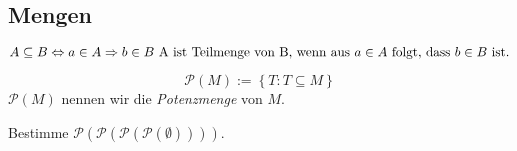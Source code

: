 \documentclass[10pt]{scrbook}
\begin{document}
\subsection{Mengen}
\begin{Def}
\begin{displaymath}
	A\subseteq B\Leftrightarrow a\in A \Rightarrow b\in B\textnormal{ A ist Teilmenge von B, wenn aus }a\in A\textnormal{ folgt, dass }b\in B\textnormal{ ist}.
\end{displaymath}
\end{Def}
\begin{Def}
\begin{displaymath}
	\mathcal{P}(M):=\left\{T: T\subseteq M\right\}
\end{displaymath}
$\mathcal{P}(M)$ nennen wir die \emph{Potenzmenge} von $M$.
\end{Def}
\begin{Auf}
Bestimme $\mathcal{P}(\mathcal{P}(\mathcal{P}(\mathcal{P}(\emptyset))))$.
\end{Auf}
\end{document}
